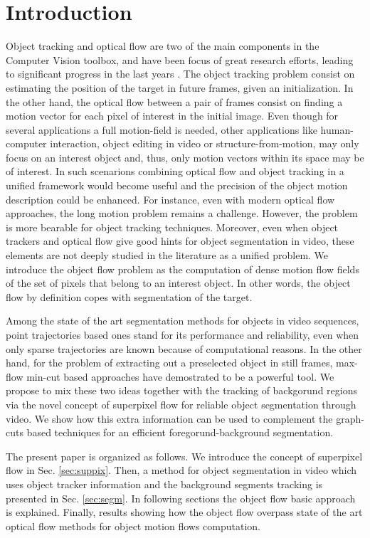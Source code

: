 \section{Introduction}
\label{sec:introduction}

Object tracking and optical flow are two of the main components in the
Computer Vision toolbox, and have been focus of great research efforts, 
leading to significant progress in the last years \cite{c16}\cite{c17}. 
The object tracking problem consist on estimating the 
position of the target in future frames, given an initialization. In the
other hand, the optical flow between a pair of frames consist on finding a motion vector 
for each pixel of interest in the initial image. Even though for several
applications a full motion-field is needed, other applications like
human-computer interaction, object editing in video or structure-from-motion,
may only focus on an interest object and, thus, only motion vectors within its 
space may be of interest. 
In such scenarions combining optical flow and object tracking in a unified 
framework would become useful and the precision of the object motion description 
could be enhanced. For instance, even with modern optical flow approaches, 
the long motion problem remains a challenge. However, the problem is more 
bearable for object tracking techniques. Moreover, even when object
trackers and optical flow give good hints for object segmentation in video, 
these elements are not deeply studied in the literature as a unified problem.
We introduce the object flow problem as the computation of dense motion 
flow fields of the set of pixels that belong to an interest object. In other words, 
the object flow by definition copes with segmentation of the target.

Among the state of the art segmentation methods for objects in video
sequences, point trajectories based ones stand for its performance and 
reliability, even when only sparse trajectories are known because of
computational reasons. In the other hand, for the problem of extracting out a 
preselected object in still frames, max-flow min-cut based approaches 
have demostrated to be a powerful tool. We propose to mix these two 
ideas together with the tracking of backgorund regions via the novel concept of 
superpixel flow for reliable object segmentation through video. 
We show how this extra information can be used to complement the
graph-cuts based techniques for an efficient foregorund-background segmentation.

The present paper is organized as follows. We introduce the concept of superpixel flow
in Sec. \ref{sec:suppix}. Then, a method for object segmentation in video which uses object tracker 
information and the background segments tracking is presented in Sec. \ref{sec:segm}. In following
sections the object flow basic approach is explained. Finally, results showing how 
the object flow overpass state of the art optical flow methods for object motion flows 
computation.

